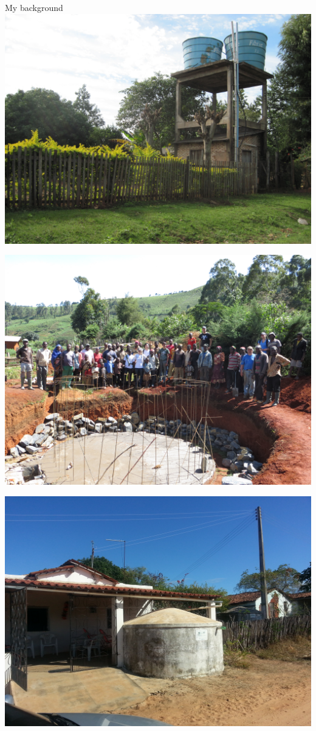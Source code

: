 \documentclass[
  ignorenonframetext,
]{beamer}
\begin{document}
\begin{frame}{My background}
\label{my-background}
\includegraphics{water-caaguazu.JPG}

\includegraphics{ewb-roh.JPG}

\includegraphics{cisterna-ceara.jpg}


\end{frame}
\end{document}
